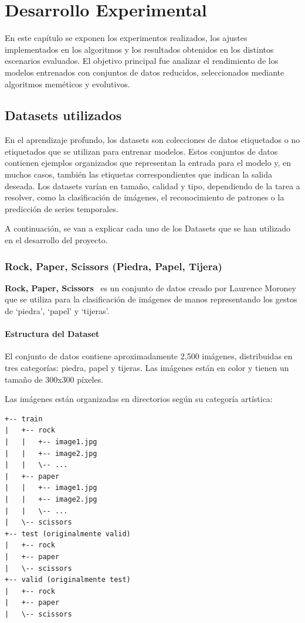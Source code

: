 
\chapter{Desarrollo Experimental}\label{ch:desarrollo-experimental}
En este capítulo se exponen los experimentos realizados, los ajustes implementados en los algoritmos y los resultados
obtenidos en los distintos escenarios evaluados.
El objetivo principal fue analizar el rendimiento de los modelos entrenados con conjuntos de datos reducidos,
seleccionados mediante algoritmos meméticos y evolutivos.

\section{Datasets utilizados}\label{sec:datasets}
En el aprendizaje profundo, los datasets son colecciones de datos etiquetados o no etiquetados que se utilizan para
entrenar modelos.
Estos conjuntos de datos contienen ejemplos organizados que representan la entrada para el modelo y, en muchos casos,
también las etiquetas correspondientes que indican la salida deseada.
Los datasets varían en tamaño, calidad y tipo, dependiendo de la tarea a resolver, como la clasificación de imágenes,
el reconocimiento de patrones o la predicción de series temporales.


A continuación, se van a explicar cada uno de los Datasets que se han utilizado en el desarrollo del proyecto.

\subsection{Rock, Paper, Scissors (Piedra, Papel, Tijera)}\label{subsec:rock-paper-scissors}
\textbf{Rock, Paper, Scissors}~\cite{noauthor_rock_nodate} es un conjunto de datos creado por Laurence Moroney
que se utiliza para la clasificación de imágenes de manos representando los gestos de `piedra', `papel' y `tijeras'.

\subsubsection{Estructura del Dataset}
El conjunto de datos contiene aproximadamente 2,500 imágenes, distribuidas en tres categorías: piedra, papel y tijeras.
Las imágenes están en color y tienen un tamaño de 300x300 píxeles.

Las imágenes están organizadas en directorios según su categoría artística:
\begin{verbatim}
+-- train
|   +-- rock
|   |   +-- image1.jpg
|   |   +-- image2.jpg
|   |   \-- ...
|   +-- paper
|   |   +-- image1.jpg
|   |   +-- image2.jpg
|   |   \-- ...
|   \-- scissors
+-- test (originalmente valid)
|   +-- rock
|   +-- paper
|   \-- scissors
+-- valid (originalmente test)
|   +-- rock
|   +-- paper
|   \-- scissors
\end{verbatim}


